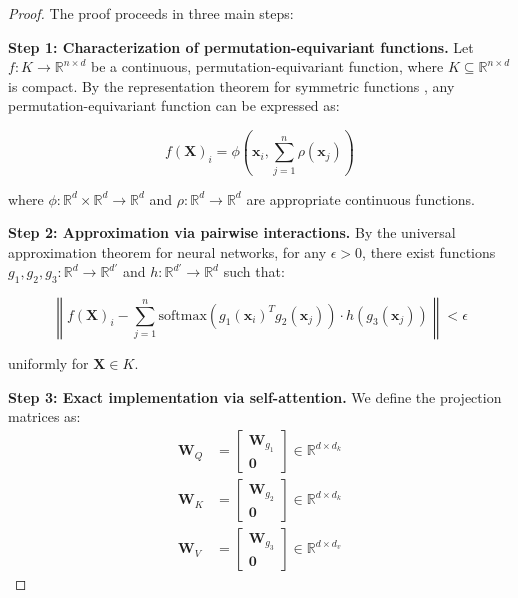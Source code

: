 \begin{proof}
    The proof proceeds in three main steps:

    \textbf{Step 1: Characterization of permutation-equivariant functions.}
    Let $f: K \to \mathbb{R}^{n \times d}$ be a continuous, permutation-equivariant function, where $K \subseteq \mathbb{R}^{n \times d}$ is compact. By the representation theorem for symmetric functions \citep{zaheer2017deepsets}, any permutation-equivariant function can be expressed as:

    \begin{equation}
        f(\mathbf{X})_i = \phi\left(\mathbf{x}_i, \sum_{j=1}^n \rho(\mathbf{x}_j)\right)
        \label{eq:symmetric_representation}
    \end{equation}

    where $\phi: \mathbb{R}^d \times \mathbb{R}^d \to \mathbb{R}^d$ and $\rho: \mathbb{R}^d \to \mathbb{R}^d$ are appropriate continuous functions.

    \textbf{Step 2: Approximation via pairwise interactions.}
    By the universal approximation theorem for neural networks, for any $\epsilon > 0$, there exist functions $g_1, g_2, g_3: \mathbb{R}^d \to \mathbb{R}^{d'}$ and $h: \mathbb{R}^{d'} \to \mathbb{R}^d$ such that:

    \begin{equation}
        \left\|f(\mathbf{X})_i - \sum_{j=1}^n \text{softmax}(g_1(\mathbf{x}_i)^T g_2(\mathbf{x}_j)) \cdot h(g_3(\mathbf{x}_j))\right\| < \epsilon
        \label{eq:pairwise_approximation}
    \end{equation}

    uniformly for $\mathbf{X} \in K$.

    \textbf{Step 3: Exact implementation via self-attention.}
    We define the projection matrices as:
    \begin{align}
        \mathbf{W}_Q &= \begin{bmatrix} \mathbf{W}_{g_1} \\ \mathbf{0} \end{bmatrix} \in \mathbb{R}^{d \times d_k} \\
        \mathbf{W}_K &= \begin{bmatrix} \mathbf{W}_{g_2} \\ \mathbf{0} \end{bmatrix} \in \mathbb{R}^{d \times d_k} \\
        \mathbf{W}_V &= \begin{bmatrix} \mathbf{W}_{g_3} \\ \mathbf{0} \end{bmatrix} \in \mathbb{R}^{d \times d_v}
    \end{align}


\end{proof}
